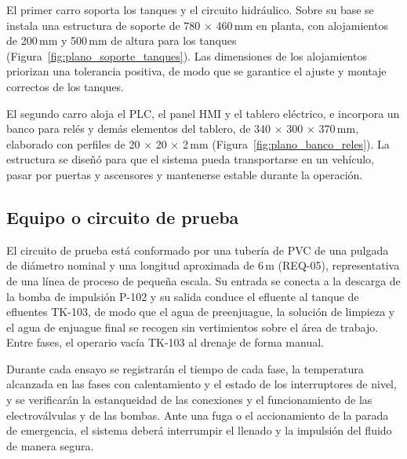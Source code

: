 
El primer carro soporta los tanques y el circuito hidráulico. Sobre su base se instala una estructura de soporte de 780 × 460\,mm en planta, con alojamientos de 200\,mm y 500\,mm de altura para los tanques (Figura~\ref{fig:plano_soporte_tanques}). Las dimensiones de los alojamientos priorizan una tolerancia positiva, de modo que se garantice el ajuste y montaje correctos de los tanques.


El segundo carro aloja el PLC, el panel HMI y el tablero eléctrico, e incorpora un banco para relés y demás elementos del tablero, de 340 × 300 × 370\,mm, elaborado con perfiles de 20 × 20 × 2\,mm (Figura~\ref{fig:plano_banco_reles}). La estructura se diseñó para que el sistema pueda transportarse en un vehículo, pasar por puertas y ascensores y mantenerse estable durante la operación.


\subsection{Equipo o circuito de prueba}
El circuito de prueba está conformado por una tubería de PVC de una pulgada de diámetro nominal y una longitud aproximada de 6\,m (REQ-05), representativa de una línea de proceso de pequeña escala. Su entrada se conecta a la descarga de la bomba de impulsión P-102 y su salida conduce el efluente al tanque de efluentes TK-103, de modo que el agua de preenjuague, la solución de limpieza y el agua de enjuague final se recogen sin vertimientos sobre el área de trabajo. Entre fases, el operario vacía TK-103 al drenaje de forma manual.

Durante cada ensayo se registrarán el tiempo de cada fase, la temperatura alcanzada en las fases con calentamiento y el estado de los interruptores de nivel, y se verificarán la estanqueidad de las conexiones y el funcionamiento de las electroválvulas y de las bombas. Ante una fuga o el accionamiento de la parada de emergencia, el sistema deberá interrumpir el llenado y la impulsión del fluido de manera segura.

